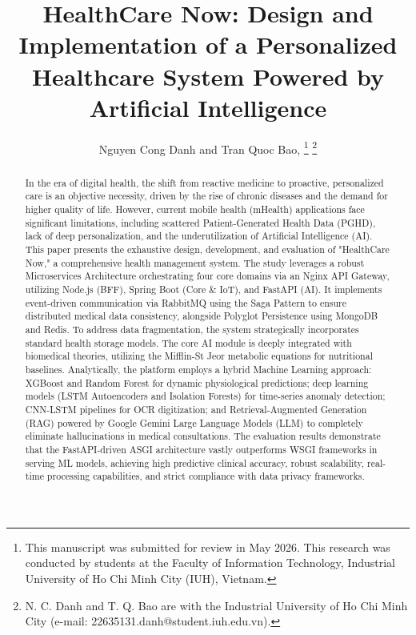 \documentclass[journal, a4paper]{IEEEtran}
\begin{document}
\title{HealthCare Now: Design and Implementation of a Personalized Healthcare System Powered by Artificial Intelligence}

\author{Nguyen Cong Danh and Tran Quoc Bao, 
\thanks{This manuscript was submitted for review in May 2026. This research was conducted by students at the Faculty of Information Technology, Industrial University of Ho Chi Minh City (IUH), Vietnam.}
\thanks{N. C. Danh and T. Q. Bao are with the Industrial University of Ho Chi Minh City (e-mail: 22635131.danh@student.iuh.edu.vn).}}

\maketitle

\begin{abstract}
In the era of digital health, the shift from reactive medicine to proactive, personalized care is an objective necessity, driven by the rise of chronic diseases and the demand for higher quality of life. However, current mobile health (mHealth) applications face significant limitations, including scattered Patient-Generated Health Data (PGHD), lack of deep personalization, and the underutilization of Artificial Intelligence (AI). This paper presents the exhaustive design, development, and evaluation of "HealthCare Now," a comprehensive health management system. The study leverages a robust Microservices Architecture orchestrating four core domains via an Nginx API Gateway, utilizing Node.js (BFF), Spring Boot (Core \& IoT), and FastAPI (AI). It implements event-driven communication via RabbitMQ using the Saga Pattern to ensure distributed medical data consistency, alongside Polyglot Persistence using MongoDB and Redis. To address data fragmentation, the system strategically incorporates standard health storage models. The core AI module is deeply integrated with biomedical theories, utilizing the Mifflin-St Jeor metabolic equations for nutritional baselines. Analytically, the platform employs a hybrid Machine Learning approach: XGBoost and Random Forest for dynamic physiological predictions; deep learning models (LSTM Autoencoders and Isolation Forests) for time-series anomaly detection; CNN-LSTM pipelines for OCR digitization; and Retrieval-Augmented Generation (RAG) powered by Google Gemini Large Language Models (LLM) to completely eliminate hallucinations in medical consultations. The evaluation results demonstrate that the FastAPI-driven ASGI architecture vastly outperforms WSGI frameworks in serving ML models, achieving high predictive clinical accuracy, robust scalability, real-time processing capabilities, and strict compliance with data privacy frameworks.


\end{abstract}
\end{document}
